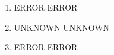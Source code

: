 \documentclass{article}
\begin{document}
\begin{enumerate}[label=\textbf{\Alph*.}]
	\item
	ERROR
	ERROR
	\item
	UNKNOWN
	UNKNOWN
	\item
	ERROR
	ERROR
\end{enumerate}
\end{document}

